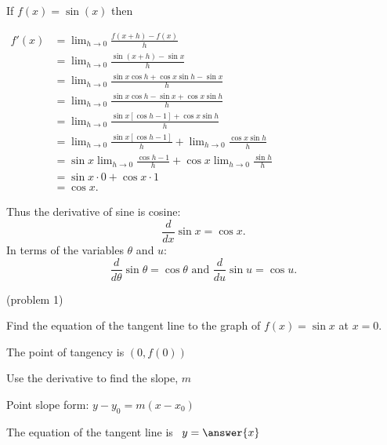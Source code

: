 \documentclass[handout]{ximera}
\begin{document}
\begin{explanation} %
If $f(x) = \sin(x)$ then
\begin{center}
$\begin{aligned}
f'(x) &= \lim_{h \to 0} \frac{f(x+h)-f(x)}{h} \\[5pt]
&= \lim_{h \to 0} \frac{\sin(x+h) - \sin x }{h}\\[5pt]
&=  \lim_{h \to 0} \frac{\sin x \cos h + \cos x \sin h  - \sin x }{h}\\[5pt]
&=  \lim_{h \to 0} \frac{\sin x \cos h  - \sin x  + \cos x \sin h }{h}\\[5pt]
&=  \lim_{h \to 0} \frac{\sin x [\cos h  -1] + \cos x \sin h }{h}\\[5pt]
&=  \lim_{h \to 0} \frac{\sin x [\cos h  -1]}{h} +\lim_{h \to 0} \frac{\cos x \sin h }{h}\\[5pt]
&=  \sin x\lim_{h \to 0} \frac{ \cos h  -1}{h} +\cos x\lim_{h \to 0} \frac{ \sin h }{h}\\[5pt]
&=  \sin x \cdot 0 + \cos x  \cdot 1 \\[5pt]
&= \cos x.
\end{aligned}$
\end{center}
Thus the derivative of sine is cosine:
\[
\frac{d}{dx}\sin x  = \cos x.
\]
In terms of the variables $\theta$ and $u$:
\[
\frac{d}{d\theta}\sin \theta  = \cos \theta  \text{  and  } \frac{d}{du}\sin u  = \cos u .
\]
\end{explanation}



\begin{problem}(problem 1)

Find the equation of the tangent line to the graph of $f(x) = \sin x$ at $x=0.$

\begin{hint}
The point of tangency is $(0, f(0))$
\end{hint}
\begin{hint}
Use the derivative to find the slope, $m$
\end{hint}
\begin{hint}
Point slope form: $y-y_0 = m(x-x_0)$
\end{hint}

The equation of the tangent line is \ $y = \answer{x}$

\end{problem}
\end{document}
